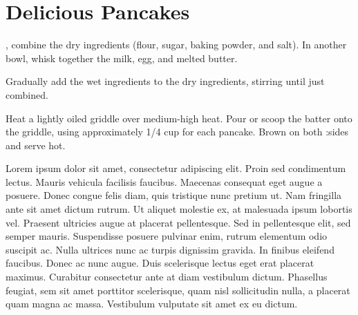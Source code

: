 \chapter{Delicious Pancakes}



, combine the dry ingredients (flour, sugar, baking powder, and salt). In another bowl, whisk together the milk, egg, and melted butter.

Gradually add the wet ingredients to the dry ingredients, stirring until just combined.

Heat a lightly oiled griddle over medium-high heat. Pour or scoop the batter onto the griddle, using approximately 1/4 cup for each pancake. Brown on both :sides and serve hot.

Lorem ipsum dolor sit amet, consectetur adipiscing elit. Proin sed condimentum lectus. Mauris vehicula facilisis faucibus. Maecenas consequat eget augue a posuere. Donec congue felis diam, quis tristique nunc pretium ut. Nam fringilla ante sit amet dictum rutrum. Ut aliquet molestie ex, at malesuada ipsum lobortis vel. Praesent ultricies augue at placerat pellentesque. Sed in pellentesque elit, sed semper mauris. Suspendisse posuere pulvinar enim, rutrum elementum odio suscipit ac. Nulla ultrices nunc ac turpis dignissim gravida. In finibus eleifend faucibus. Donec ac nunc augue. Duis scelerisque lectus eget erat placerat maximus. Curabitur consectetur ante at diam vestibulum dictum. Phasellus feugiat, sem sit amet porttitor scelerisque, quam nisl sollicitudin nulla, a placerat quam magna ac massa. Vestibulum vulputate sit amet ex eu dictum.

